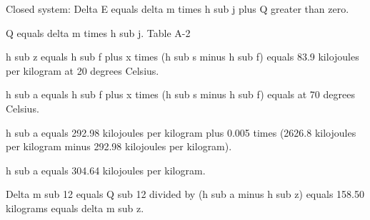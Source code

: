 Closed system:  
Delta E equals delta m times h sub j plus Q greater than zero.  

Q equals delta m times h sub j.  
Table A-2  

h sub z equals h sub f plus x times (h sub s minus h sub f) equals 83.9 kilojoules per kilogram at 20 degrees Celsius.  

h sub a equals h sub f plus x times (h sub s minus h sub f) equals at 70 degrees Celsius.  

h sub a equals 292.98 kilojoules per kilogram plus 0.005 times (2626.8 kilojoules per kilogram minus 292.98 kilojoules per kilogram).  

h sub a equals 304.64 kilojoules per kilogram.  

Delta m sub 12 equals Q sub 12 divided by (h sub a minus h sub z) equals 158.50 kilograms equals delta m sub z.